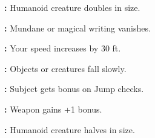 \begin{multicols}{2}
\begin{description*}
\item \tabto{5mm} \textbf{:} Humanoid creature doubles in size.
\item \tabto{5mm} \textbf{:} Mundane or magical writing vanishes.
\item \tabto{5mm} \textbf{:} Your speed increases by 30 ft.
\item \tabto{5mm} \textbf{:} Objects or creatures fall slowly.
\item \tabto{5mm} \textbf{:} Subject gets bonus on Jump checks.
\item \tabto{5mm} \textbf{:} Weapon gains +1 bonus.
\item \tabto{5mm} \textbf{:} Humanoid creature halves in size.
\end{description*}


\end{multicols}
